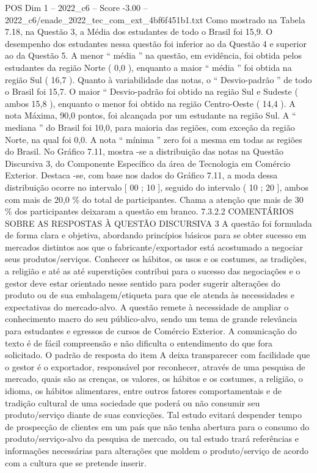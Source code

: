 \begin{textsample}{POS Dim 1 – 2022\_c6 – Score -3.00 – 2022\_c6/enade\_2022\_tec\_com\_ext\_4bf6f451b1.txt}
Como mostrado na Tabela 7.18, na Questão 3, a Média dos estudantes de todo o Brasil foi 15,9.
O desempenho dos estudantes nessa questão foi inferior ao da Questão 4 e superior ao da Questão 5.
A menor “ média ” na questão, em evidência, foi obtida pelos estudantes da região Norte ( 0,0 ), enquanto a maior “ média ” foi obtida na região Sul ( 16,7 ).
Quanto à variabilidade das notas, o “ Desvio-padrão ” de todo o Brasil foi 15,7.
O maior “ Desvio-padrão foi obtido na região Sul e Sudeste ( ambos 15,8 ), enquanto o menor foi obtido na região Centro-Oeste ( 14,4 ).
A nota Máxima, 90,0 pontos, foi alcançada por um estudante na região Sul.
A “ mediana ” do Brasil foi 10,0, para maioria das regiões, com exceção da região Norte, na qual foi 0,0.
A nota “ mínima ” zero foi a mesma em todas as regiões do Brasil.
No Gráfico 7.11, mostra -se a distribuição das notas na Questão Discursiva 3, do Componente Específico da área de Tecnologia em Comércio Exterior.
Destaca -se, com base nos dados do Gráfico 7.11, a moda dessa distribuição ocorre no intervalo [ 00 ; 10 ], seguido do intervalo ( 10 ; 20 ], ambos com mais de 20,0 \% do total de participantes.
Chama a atenção que mais de 30 \% dos participantes deixaram a questão em branco. 7.3.2.2 COMENTÁRIOS SOBRE AS RESPOSTAS À QUESTÃO DISCURSIVA 3 A questão foi formulada de forma clara e objetiva, abordando princípios básicos para se obter sucesso em mercados distintos aos que o fabricante/exportador está acostumado a negociar seus produtos/serviços.
Conhecer os hábitos, os usos e os costumes, as tradições, a religião e até as até superstições contribui para o sucesso das negociações e o gestor deve estar orientado nesse sentido para poder sugerir alterações do produto ou de sua embalagem/etiqueta para que ele atenda às necessidades e expectativas do mercado-alvo.
A questão remete à necessidade de ampliar o conhecimento macro do seu público-alvo, sendo um tema de grande relevância para estudantes e egressos de cursos de Comércio Exterior.
A comunicação do texto é de fácil compreensão e não dificulta o entendimento do que fora solicitado.
O padrão de resposta do item A deixa transparecer com facilidade que o gestor é o exportador, responsável por reconhecer, através de uma pesquisa de mercado, quais são as crenças, os valores, os hábitos e os costumes, a religião, o idioma, os hábitos alimentares, entre outros fatores comportamentais e de tradição cultural de uma sociedade que poderá ou não consumir seu produto/serviço diante de suas convicções.
Tal estudo evitará despender tempo de prospecção de clientes em um país que não tenha abertura para o consumo do produto/serviço-alvo da pesquisa de mercado, ou tal estudo trará referências e informações necessárias para alterações que moldem o produto/serviço de acordo com a cultura que se pretende inserir.

\end{textsample}
